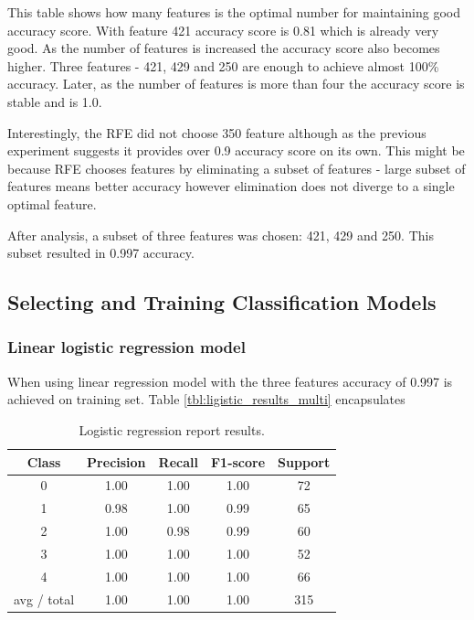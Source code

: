 \documentclass[11pt]{article}
\begin{document}
		This table shows how many features is the optimal number for maintaining good accuracy score. With feature 421 accuracy score is 0.81 which is already very good. As the number of features is increased the accuracy score also becomes higher. Three features - 421, 429 and 250 are enough to achieve almost 100\% accuracy. Later, as the number of features is more than four the accuracy score is stable and is 1.0.

		Interestingly, the RFE did not choose 350 feature although as the previous experiment suggests it provides over 0.9 accuracy score on its own. This might be because RFE chooses features by eliminating a subset of features - large subset of features means better accuracy however elimination does not diverge to a single optimal feature. 

		After analysis, a subset of three features was chosen: 421, 429 and 250. This subset resulted in 0.997 accuracy.

		\subsection{Selecting and Training Classification Models}
			\subsubsection{Linear logistic regression model}
 			 	When using linear regression model with the three features accuracy of 0.997 is achieved on training set. Table \ref{tbl:ligistic_results_multi} encapsulates 

			\begin{center}
			  	\begin{table}[h]
			  	\centering
				\begin{tabular}[b]{| c | c | c | c | c |}
					\hline
					Class & Precision &  Recall & F1-score & Support  \\
		 			\hline
					  0   &    1.00   &   1.00   &   1.00    &    72 \\
			          1   &    0.98   &   1.00   &   0.99    &    65 \\
			          2   &    1.00   &   0.98   &   0.99    &    60 \\
			          3   &    1.00   &   1.00   &   1.00    &    52 \\
			          4   &    1.00   &   1.00   &   1.00    &    66 \\
		  			\hline
					  avg / total   &    1.00   &   1.00   &   1.00   &    315 \\
					\hline
				\end{tabular}
				\caption{Logistic regression report results.}
				\label{tbl:logistic_resuts_multi}
				\end{table}
			\end{center}
			\vspace*{-1.5cm}
\end{document}
